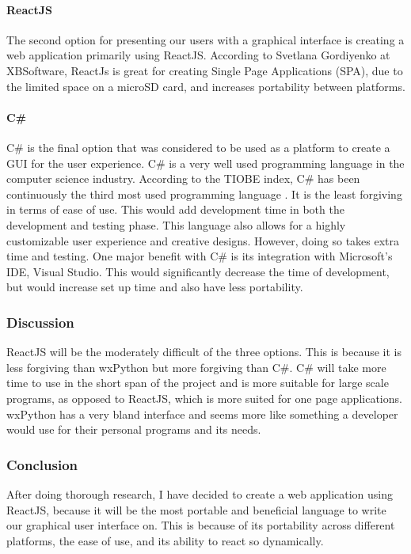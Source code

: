 \paragraph{ReactJS}
The second option for presenting our users with a graphical interface is creating a web application primarily using ReactJS. According to Svetlana Gordiyenko at XBSoftware, ReactJs is great for creating Single Page Applications (SPA)\cite{React}, due to the limited space on a microSD card, and increases portability between platforms.
\paragraph{C\#}
C\# is the final option that was considered to be used as a platform to create a GUI for the user experience. C\# is a very well used programming language in the computer science industry. According to the TIOBE index,  C\# has been continuously the third most used programming language \cite{TIOBE}. It is the least forgiving in terms of ease of use. This would add development time in both the development and testing phase. This language also allows for a highly customizable user experience and creative designs. However, doing so takes extra time and testing. One major benefit with C\# is its integration with Microsoft's IDE, Visual Studio. This would significantly decrease the time of development, but would increase set up time and also have less portability.
\subsubsection{Discussion}
ReactJS will be the moderately difficult of the three options. This is because it is less forgiving than wxPython but more forgiving than C\#. C\# will take more time to use in the short span of the project and is more suitable for large scale programs, as opposed to ReactJS, which is more suited for one page applications. wxPython has a very bland interface and seems more like something a developer would use for their personal programs and its needs.
\subsubsection{Conclusion}
After doing thorough research, I have decided to create a web application using ReactJS, because it will be the most portable and beneficial language to write our graphical user interface on. This is because of its portability across different platforms, the ease of use, and its ability to react so dynamically.


